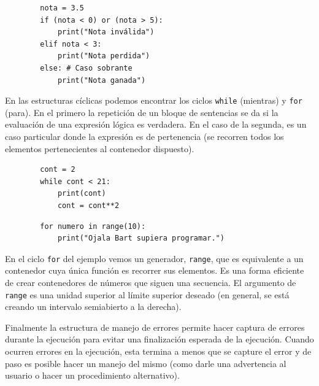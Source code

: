 \begin{listing}[H]
    \begin{verbatim}
        nota = 3.5
        if (nota < 0) or (nota > 5):
            print("Nota inválida")
        elif nota < 3:
            print("Nota perdida")
        else: # Caso sobrante
            print("Nota ganada")
    \end{verbatim}
\end{listing}


En las estructuras cíclicas podemos encontrar los ciclos \texttt{while}
(mientras) y \texttt{for} (para). En el primero la repetición de un
bloque de sentencias se da si la evaluación de una expresión lógica es
verdadera. En el caso de la segunda, es un caso particular donde la
expresión es de pertenencia (se recorren todos los elementos
pertenecientes al contenedor dispuesto).

\begin{listing}[H]
    \begin{verbatim}
        cont = 2
        while cont < 21:
            print(cont)
            cont = cont**2
    \end{verbatim}
\end{listing}


\begin{listing}[H]
    \begin{verbatim}
        for numero in range(10):
            print("Ojala Bart supiera programar.")
    \end{verbatim}
\end{listing}


En el ciclo \texttt{for} del ejemplo vemos un generador, \texttt{range},
que es equivalente a un contenedor cuya única función es recorrer sus
elementos. Es una forma eficiente de crear contenedores de números que
siguen una secuencia. El argumento de \texttt{range} es una unidad
superior al límite superior deseado (en general, se está creando un
intervalo semiabierto a la derecha).

Finalmente la estructura de manejo de errores permite hacer captura de
errores durante la ejecución para evitar una finalización esperada de la
ejecución. Cuando ocurren errores en la ejecución, esta termina a menos
que se capture el error y de paso es posible hacer un manejo del mismo
(como darle una advertencia al usuario o hacer un procedimiento
alternativo).

